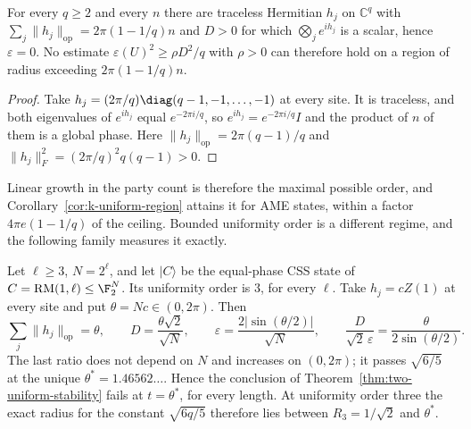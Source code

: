 \begin{proposition}
\label{prop:region-ceiling}
For every \(q\geq2\) and every \(n\) there are traceless Hermitian \(h_j\)
on \(\mathbb C^q\) with
\(\sum_j\lVert h_j\rVert_{\mathrm{op}}=2\pi(1-1/q)n\) and \(D>0\) for which
\(\bigotimes_je^{ih_j}\) is a scalar, hence \(\varepsilon=0\).  No estimate
\(\varepsilon(U)^2\geq\rho D^2/q\) with \(\rho>0\) can therefore hold on a
region of radius exceeding \(2\pi(1-1/q)n\).
\end{proposition}

\begin{proof}
Take \(h_j=(2\pi/q)\diag(q-1,-1,\ldots,-1)\) at every site.  It is
traceless, and both eigenvalues of \(e^{ih_j}\) equal \(e^{-2\pi i/q}\), so
\(e^{ih_j}=e^{-2\pi i/q}I\) and the product of \(n\) of them is a global
phase.  Here \(\lVert h_j\rVert_{\mathrm{op}}=2\pi(q-1)/q\) and
\(\lVert h_j\rVert_F^2=(2\pi/q)^2q(q-1)>0\).
\end{proof}

Linear growth in the party count is therefore the maximal possible order,
and Corollary~\ref{cor:k-uniform-region} attains it for AME states, within
a factor \(4\pi e(1-1/q)\) of the ceiling.  Bounded uniformity order is a
different regime, and the following family measures it exactly.

\begin{proposition}
\label{prop:stability-region}
Let \(\ell\geq3\), \(N=2^\ell\), and let \(\lvert C\rangle\) be the
equal-phase CSS state of \(C=\mathrm{RM}(1,\ell)\leq\F_2^N\).  Its
uniformity order is \(3\), for every \(\ell\).  Take
\(h_j=cZ(1)\) at every site and put \(\theta=Nc\in(0,2\pi)\).  Then
\[
 \sum_j\lVert h_j\rVert_{\mathrm{op}}=\theta,\qquad
 D=\frac{\theta\sqrt2}{\sqrt N},\qquad
 \varepsilon=\frac{2\lvert\sin(\theta/2)\rvert}{\sqrt N},\qquad
 \frac D{\sqrt2\,\varepsilon}=\frac\theta{2\sin(\theta/2)} .
\]
The last ratio does not depend on \(N\) and increases on \((0,2\pi)\); it
passes \(\sqrt{6/5}\) at the unique \(\theta^*=1.46562\ldots\).  Hence the
conclusion of Theorem~\ref{thm:two-uniform-stability} fails at
\(t=\theta^*\), for every length.  At uniformity order three the exact
radius for the constant \(\sqrt{6q/5}\) therefore lies between
\(R_3=1/\sqrt2\) and \(\theta^*\).
\end{proposition}

